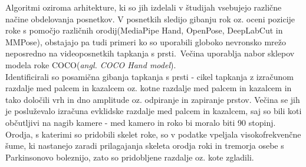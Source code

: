 \documentclass[a4paper,12pt]{article}
\begin{document}
Algoritmi oziroma arhitekture, ki so jih izdelali v študijah vsebujejo različne načine obdelovanja posnetkov. V 
posnetkih sledijo gibanju rok oz. oceni pozicije roke s pomočjo različnih orodij(MediaPipe Hand, OpenPose, 
DeepLabCut in MMPose), obstajajo pa tudi primeri ko so uporabili globoko nevronsko mrežo neposredno na 
videoposnetkih tapkanja s prsti.\
Večina uporablja nabor sklepov modela roke COCO(\textit{angl. COCO Hand model}). \\

Identificirali so posamična gibanja tapkanja s prsti - cikel tapkanja z izračunom razdalje med palcem in 
kazalcem oz. kotne razdalje med palcem in kazalcem in tako določili vrh in dno amplitude oz. odpiranje in 
zapiranje prstov. Večina se jih je posluževalo izračuna evklidske razdalje med palcem in kazalcem, saj so 
bili koti občutljivi na nagib kamere - med kamero in roko bi moralo biti 90 stopinj. Orodja, s katerimi so 
pridobili skelet roke, so v podatke vpeljala visokofrekvenčne šume, ki nastanejo zaradi prilagajanja skeleta 
orodja roki in tremorja osebe s Parkinsonovo boleznijo, zato so pridobljene razdalje oz. kote zgladili. \\
\end{document}
